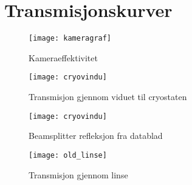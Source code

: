 \appendix
\section{Transmisjonskurver}

\begin{figure}[H]%
\centering
\texttt{[image: kameragraf]}%
\caption{Kameraeffektivitet}%
\label{fig:kameragraf}%
\end{figure}

\begin{figure}[H]%
\centering
\texttt{[image: cryovindu]}%
\caption{Transmisjon gjennom viduet til cryostaten}%
\label{fig:cryovindu}%
\end{figure}


\begin{figure}[H]%
\centering
\texttt{[image: cryovindu]}%
\caption{Beamsplitter refleksjon fra datablad}%
\label{fig:beamsplitter400-700nm}%
\end{figure}

\begin{figure}[H]%
\centering
\texttt{[image: old\_linse]}%
\caption{Transmisjon gjennom linse}%
\label{fig:linsetrans}%
\end{figure}